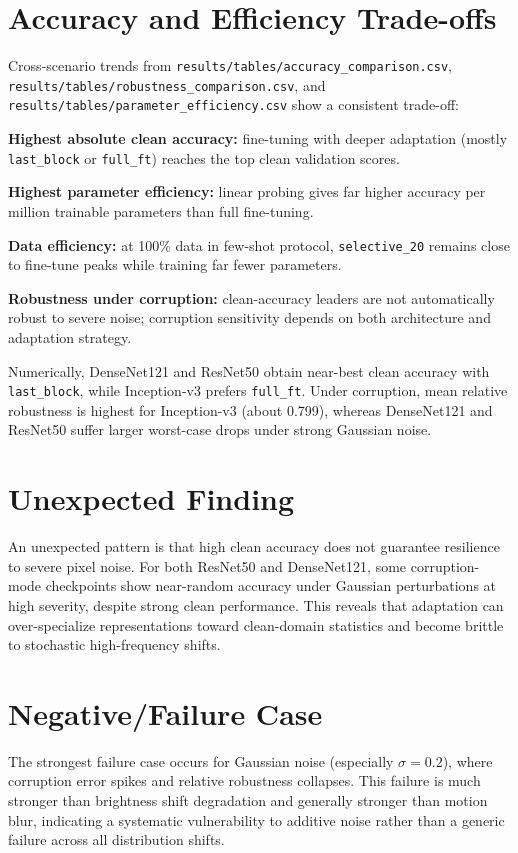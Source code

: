 \documentclass[11pt,a4paper]{report}
\renewenvironment{leftbar}[1][\hsize]
  {\def\FrameCommand{{\color{subsectionblue}\vrule width 3pt}\hspace{0pt}}%
   \MakeFramed{\hsize#1\advance\hsize-\width\FrameRestore}}
  {\endMakeFramed}
\renewenvironment{itemize}{\begin{leftbar}\begin{originalitemize}}{\end{originalitemize}\end{leftbar}}
\begin{document}
\section{Accuracy and Efficiency Trade-offs}
Cross-scenario trends from \texttt{results/tables/accuracy\_comparison.csv}, \texttt{results/tables/robustness\_comparison.csv}, and \texttt{results/tables/parameter\_efficiency.csv} show a consistent trade-off:
\begin{itemize}
  \item \textbf{Highest absolute clean accuracy:} fine-tuning with deeper adaptation (mostly \texttt{last\_block} or \texttt{full\_ft}) reaches the top clean validation scores.
  \item \textbf{Highest parameter efficiency:} linear probing gives far higher accuracy per million trainable parameters than full fine-tuning.
  \item \textbf{Data efficiency:} at 100\% data in few-shot protocol, \texttt{selective\_20} remains close to fine-tune peaks while training far fewer parameters.
  \item \textbf{Robustness under corruption:} clean-accuracy leaders are not automatically robust to severe noise; corruption sensitivity depends on both architecture and adaptation strategy.
\end{itemize}

Numerically, DenseNet121 and ResNet50 obtain near-best clean accuracy with \texttt{last\_block}, while Inception-v3 prefers \texttt{full\_ft}. Under corruption, mean relative robustness is highest for Inception-v3 (about 0.799), whereas DenseNet121 and ResNet50 suffer larger worst-case drops under strong Gaussian noise.

\section{Unexpected Finding}
An unexpected pattern is that high clean accuracy does not guarantee resilience to severe pixel noise. For both ResNet50 and DenseNet121, some corruption-mode checkpoints show near-random accuracy under Gaussian perturbations at high severity, despite strong clean performance. This reveals that adaptation can over-specialize representations toward clean-domain statistics and become brittle to stochastic high-frequency shifts.

\section{Negative/Failure Case}
The strongest failure case occurs for Gaussian noise (especially $\sigma=0.2$), where corruption error spikes and relative robustness collapses. This failure is much stronger than brightness shift degradation and generally stronger than motion blur, indicating a systematic vulnerability to additive noise rather than a generic failure across all distribution shifts.
\end{document}
